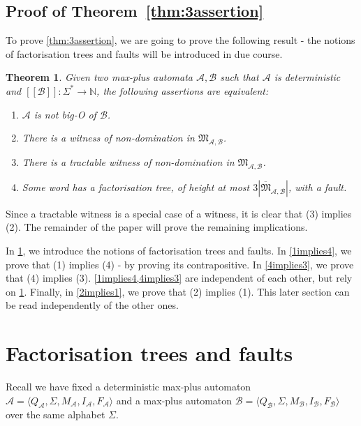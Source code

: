 \documentclass[10pt,a4paper]{amsart}
\newtheorem{thm}{Theorem}[section]
\theoremstyle{definition}
\numberwithin{equation}{section}
\theoremstyle{remark}
\newcommand{\N}{\mathbb{N}}
\newcommand{\ideal}{\mathfrak{M}}
\newcommand{\autA}{\mathcal{A}}
\newcommand{\autB}{\mathcal{B}}
\newcommand{\brfunc}[1]{[\![#1]\!]}
\newcommand{\funcB}{\brfunc{\autB}}
\theoremstyle{remark}
\begin{document}
\subsection{Proof of Theorem~\ref{thm:3assertion}}

To prove \cref{thm:3assertion}, we are going to prove the following result - the notions of factorisation trees and faults will be introduced in due course.

\begin{thm}\label{thm:4assertion}
Given two max-plus automata $\autA,\autB$ such that $\autA$ is deterministic and $\funcB:\Sigma^* \to \N$, the following assertions are equivalent:
\begin{enumerate}[label={\normalfont(\arabic*)}]
\item $\autA$ is not big-O of $\autB$.
\item There is a witness of non-domination in $\ideal_{\autA,\autB}$.
\item There is a tractable witness of non-domination in $\ideal_{\autA,\autB}$.
\item Some word has a factorisation tree, of height at most $3|\overline{\ideal}_{\autA,\autB}|$, with a fault.
\end{enumerate}
\end{thm}

Since a tractable witness is a special case of a witness, it is clear that (3) implies (2). The remainder of the paper will prove the remaining implications. 

In \cref{section:facto-fault}, we introduce the notions of factorisation trees and faults. In \cref{1implies4}, we prove that (1) implies (4) - by proving its contrapositive. In \cref{4implies3}, we prove that (4) implies (3). \cref{1implies4,4implies3} are independent of each other, but rely on \cref{section:facto-fault}. Finally, in \cref{2implies1}, we prove that (2) implies (1). This later section can be read independently of the other ones.

\section{Factorisation trees and faults}
\label{section:facto-fault}

Recall we have fixed a deterministic max-plus automaton $\autA = \langle Q_\autA, \Sigma, M_\autA, I_\autA, F_\autA\rangle$ and a max-plus automaton $\autB = \langle Q_\autB, \Sigma, M_\autB, I_\autB, F_\autB\rangle$ over the same alphabet $\Sigma$.
\end{document}
